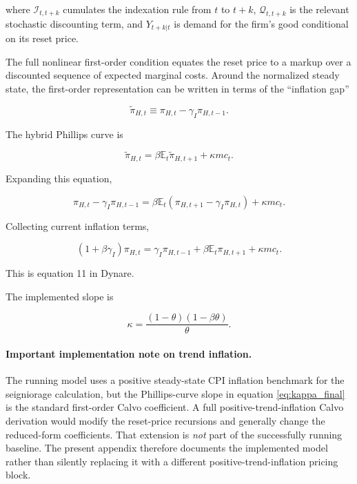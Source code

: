 where \(\mathcal I_{t,t+k}\) cumulates the indexation rule from \(t\) to
\(t+k\), \(\mathcal Q_{t,t+k}\) is the relevant stochastic discounting term,
and \(Y_{t+k|t}\) is demand for the firm's good conditional on its reset price.

The full nonlinear first-order condition equates the reset price to a markup
over a discounted sequence of expected marginal costs. Around the normalized
steady state, the first-order representation can be written in terms of the
``inflation gap''

\begin{equation}
\widetilde\pi_{H,t}
\equiv
\pi_{H,t}-\gamma_I\pi_{H,t-1}.
\end{equation}

The hybrid Phillips curve is

\begin{equation}
\widetilde\pi_{H,t}
=
\beta\mathbb E_t\widetilde\pi_{H,t+1}
+
\kappa mc_t.
\label{eq:nkpc_gap}
\end{equation}

Expanding this equation,

\begin{equation}
\pi_{H,t}-\gamma_I\pi_{H,t-1}
=
\beta\mathbb E_t
\left(
\pi_{H,t+1}-\gamma_I\pi_{H,t}
\right)
+\kappa mc_t.
\end{equation}

Collecting current inflation terms,

\begin{equation}
\boxed{
(1+\beta\gamma_I)\pi_{H,t}
=
\gamma_I\pi_{H,t-1}
+
\beta\mathbb E_t\pi_{H,t+1}
+
\kappa mc_t.
}
\label{eq:nkpc_final}
\end{equation}

This is equation 11 in Dynare.

The implemented slope is

\begin{equation}
\boxed{
\kappa
=
\frac{(1-\theta)(1-\beta\theta)}{\theta}.
}
\label{eq:kappa_final}
\end{equation}

\paragraph{Important implementation note on trend inflation.}

The running model uses a positive steady-state CPI inflation benchmark for the
seigniorage calculation, but the Phillips-curve slope in
equation \eqref{eq:kappa_final} is the standard first-order Calvo coefficient.
A full positive-trend-inflation Calvo derivation would modify the reset-price
recursions and generally change the reduced-form coefficients. That extension
is \emph{not} part of the successfully running baseline. The present appendix
therefore documents the implemented model rather than silently replacing it
with a different positive-trend-inflation pricing block.

